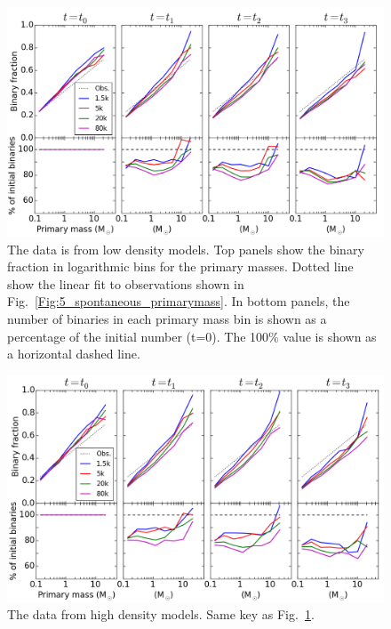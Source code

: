 \begin{figure}
\begin{center}
\includegraphics[width=\textwidth]{Figures/6_BinFrac_vs_mass_LD}
\caption{ The data is from low density models. Top panels show the binary fraction in logarithmic bins for the primary masses. Dotted line show the linear fit to observations shown in Fig.~\protect\ref{Fig:5_spontaneous_primarymass}. In bottom panels, the number of binaries in each primary mass bin is shown as a percentage of the initial number (t=0). The 100\% value is shown as a horizontal dashed line.}
\label{Fig:6_BinFracVsMass_LD}
\end{center}
\end{figure}


\begin{figure}
\begin{center}
\includegraphics[width=\textwidth]{Figures/6_BinFrac_vs_mass_HD}
\caption{ The data from high density models. Same key as Fig.~\protect\ref{Fig:6_BinFracVsMass_LD}.}
\label{Fig:6_BinFracVsMass_HD}
\end{center}
\end{figure}


